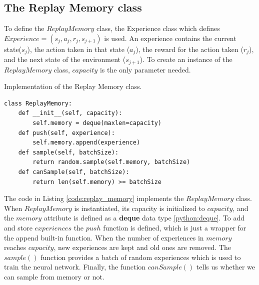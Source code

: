 \documentclass[12pt,oneside]{article}
\begin{document}
\subsection{The Replay Memory class}
To define the $ReplayMemory$ class, the Experience class which defines $Experience=(s_j, a_j, r_j, s_{j+1})$ is used. An experience contains the current state($s_j$), the action taken in that state ($a_j$), the reward for the action taken ($r_j$), and the next state of the environment ($s_{j+1}$). To create an instance of the $ReplayMemory$ class, $capacity$ is the only parameter needed.
\begin{listing}[htbp]
\caption{Implementation of the Replay Memory class.}
\label{code:replay_memory}
\begin{tcolorbox}[]
\begin{verbatim}
class ReplayMemory:
    def __init__(self, capacity):
        self.memory = deque(maxlen=capacity)
    def push(self, experience):
        self.memory.append(experience)
    def sample(self, batchSize):
        return random.sample(self.memory, batchSize)
    def canSample(self, batchSize):
        return len(self.memory) >= batchSize
\end{verbatim}
\end{tcolorbox}
\end{listing} 

The code in Listing \ref{code:replay_memory} implements the $ReplayMemory$ class. When $ReplayMemory$ is instantiated, its capacity is initialized to $capacity$, and the $memory$ attribute is defined as a \textbf{deque} data type \ref{python:deque}. To add and store $experiences$ the $push$ function is defined, which is just a wrapper for the append built-in function. When the number of experiences in $memory$ reaches $capacity$, new experiences are kept and old ones are removed. The $sample()$ function provides a batch of random experiences which is used to train the neural network. Finally, the function $canSample()$ tells us whether we can sample from memory or not.
\end{document}
